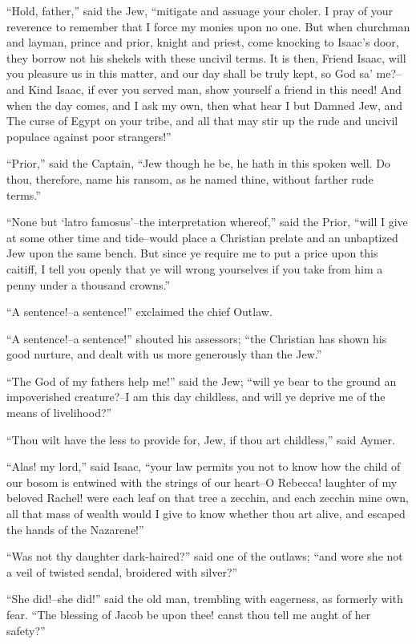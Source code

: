 ``Hold, father,'' said the Jew, ``mitigate and assuage your choler. I
pray of your reverence to remember that I force my monies upon no one.
But when churchman and layman, prince and prior, knight and priest, come
knocking to Isaac's door, they borrow not his shekels with these uncivil
terms. It is then, Friend Isaac, will you pleasure us in this matter,
and our day shall be truly kept, so God sa' me?--and Kind Isaac, if ever
you served man, show yourself a friend in this need! And when the day
comes, and I ask my own, then what hear I but Damned Jew, and The curse
of Egypt on your tribe, and all that may stir up the rude and uncivil
populace against poor strangers!''

``Prior,'' said the Captain, ``Jew though he be, he hath in this spoken
well. Do thou, therefore, name his ransom, as he named thine, without
farther rude terms.''

``None but `latro famosus'--the interpretation whereof,'' said the
Prior, ``will I give at some other time and tide--would place a
Christian prelate and an unbaptized Jew upon the same bench. But since
ye require me to put a price upon this caitiff, I tell you openly that
ye will wrong yourselves if you take from him a penny under a thousand
crowns.''

``A sentence!--a sentence!'' exclaimed the chief Outlaw.

``A sentence!--a sentence!'' shouted his assessors; ``the Christian has
shown his good nurture, and dealt with us more generously than the
Jew.''

``The God of my fathers help me!'' said the Jew; ``will ye bear to the
ground an impoverished creature?--I am this day childless, and will ye
deprive me of the means of livelihood?''

``Thou wilt have the less to provide for, Jew, if thou art childless,''
said Aymer.

``Alas! my lord,'' said Isaac, ``your law permits you not to know how
the child of our bosom is entwined with the strings of our heart--O
Rebecca! laughter of my beloved Rachel! were each leaf on that tree a
zecchin, and each zecchin mine own, all that mass of wealth would I give
to know whether thou art alive, and escaped the hands of the Nazarene!''

``Was not thy daughter dark-haired?'' said one of the outlaws; ``and
wore she not a veil of twisted sendal, broidered with silver?''

``She did!--she did!'' said the old man, trembling with eagerness, as
formerly with fear. ``The blessing of Jacob be upon thee! canst thou
tell me aught of her safety?''

